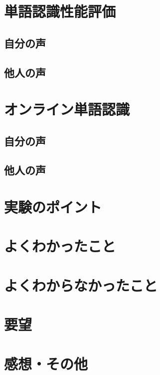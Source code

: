 \documentclass[11pt,a4paper, uplatex]{jsarticle}
\begin{document}
\section{単語認識性能評価}
\subsection{自分の声}
\subsection{他人の声}

\section{オンライン単語認識}
\subsection{自分の声}
\subsection{他人の声}


\section{実験のポイント}


\section{よくわかったこと}


\section{よくわからなかったこと}


\section{要望}

\section{感想・その他}
\end{document}
